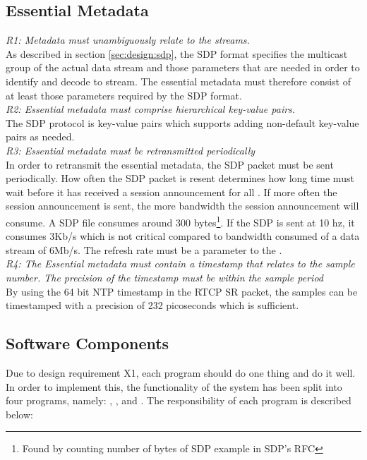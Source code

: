 \subsection{Essential Metadata} \label{sec:design:essentalmetadata}
\textit{R1: Metadata must unambiguously relate to the streams.}\\
As described in section \ref{sec:design:sdp}, the SDP format specifies the multicast group of the actual data stream and those parameters that are needed in order to identify and decode to stream.
The essential metadata must therefore consist of at least those parameters required by the SDP format.\\

\noindent \textit{R2: Essential metadata must comprise hierarchical key-value pairs.}\\
The SDP protocol is key-value pairs which supports adding non-default key-value pairs as needed. \\

\noindent \textit{R3: Essential metadata must be retransmitted periodically}\\
In order to retransmit the essential metadata, the SDP packet must be sent periodically. How often the SDP packet is resent determines how long time  must wait before it has received a session announcement for all . If more often the session announcement is sent, the more bandwidth the session announcement will consume. A SDP file consumes around 300 bytes\footnote{Found by counting number of bytes of SDP example in SDP's RFC}. If the SDP is sent at 10 hz, it consumes 3Kb/s which is not critical compared to bandwidth consumed of a data stream of 6Mb/s. The refresh rate must be a parameter to the . \\

\noindent \textit{R4: The Essential metadata must contain a timestamp that relates to the sample number. The precision of the timestamp must be within the sample period}\\
By using the 64 bit NTP timestamp in the RTCP SR packet, the samples can be timestamped with a precision of 232 picoseconds\citep{RFC5905} which is sufficient.



\subsection{Software Components}
Due to design requirement X1, each program should do one thing and do it well.
In order to implement this, the functionality of the system has been split into four programs, namely: \pub{}, \sub{}, \pro{} and \con{}. The responsibility of each program is described below:

